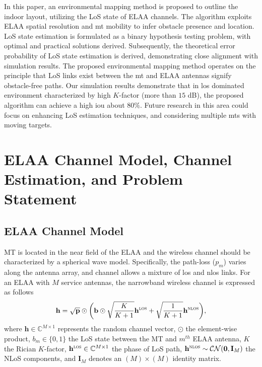 \documentclass[conference, a4paper]{IEEEtran}
\begin{document}
In this paper, an environmental mapping method is proposed to outline the indoor layout, utilizing the LoS state of ELAA channels.
The algorithm exploits ELAA spatial resolution and \gls{mt} mobility to infer obstacle presence and location.
LoS state estimation is formulated as a binary hypothesis testing problem, with optimal and practical solutions derived.
Subsequently, the theoretical error probability of LoS state estimation is derived, demonstrating close alignment with simulation results.
The proposed environmental mapping method operates on the principle that LoS links exist between the \gls{mt} and ELAA antennas signify obstacle-free paths.
Our simulation results demonstrate that in \gls{los} dominated environment characterized by high $K$-factor (more than $15$ dB), the proposed algorithm can achieve a high \gls{iou} about $80\%$.
Future research in this area could focus on enhancing LoS estimation techniques, and considering multiple \glspl{mt} with moving targets.

\section{ELAA Channel Model, Channel Estimation, and Problem Statement}\label{sec2}
\subsection{ELAA Channel Model}
MT is located in the near field of the ELAA and the wireless channel should be characterized by a spherical wave model.
Specifically, the path-loss ($p_m$) varies along the antenna array, and channel allows a mixture of \gls{los} and \gls{nlos} links.
For an ELAA with $M$ service antennas, the narrowband wireless channel is expressed as follows \cite{Liu2024a, Amiri2022}
\begin{equation} \label{eqn10380922}
	\mathbf{h}= \sqrt{\mathbf{p}} \odot \bigg(\mathbf{b} \odot \sqrt{\dfrac{K}{K + 1}} \mathbf{h}^{\textsc{los}} + \sqrt{\dfrac{1}{K + 1}} \mathbf{h}^{\textsc{nlos}}\bigg),
\end{equation}
where $\mathbf{h} \in \mathbb{C}^{M \times 1}$ represents the random channel vector, $\odot$ the element-wise product, $b_{m} \in \{0, 1\}$ the LoS state between the MT and $m^{th}$ ELAA antenna, $K$ the Rician $K$-factor, $\mathbf{h}^{\textsc{los}} \in \mathbb{C}^{M \times 1}$ the phase of LoS path, $\mathbf{h}^{\textsc{nlos}} \sim \mathcal{CN}(\mathbf{0}, \mathbf{I}_{M})$ the NLoS components, and $\mathbf{I}_{M}$ denotes an $(M) \times (M)$ identity matrix.
\end{document}
